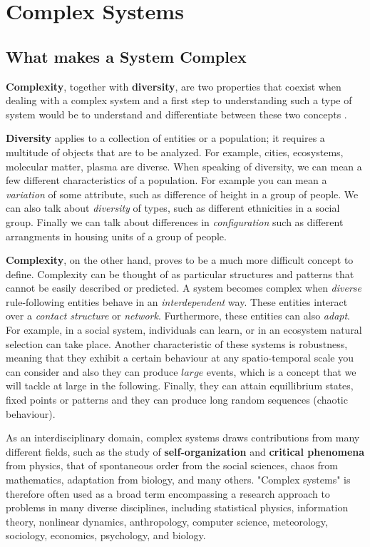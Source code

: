 \chapter{Complex Systems}
\label{chap:complexSystems}

\section{What makes a System Complex}
{\bf Complexity}, together with {\bf diversity}, are two properties that coexist when dealing with a complex system and a first step to understanding such a type of system would be to understand and differentiate between these two concepts \cite{diverscomplex}.\par

{\bf Diversity} applies to a collection of entities or a population; it requires a multitude of objects that are to be analyzed. For example, cities, ecosystems, molecular matter, plasma are diverse. When speaking of diversity, we can mean a few different characteristics of a population. For example you can mean a {\it variation} of some attribute, such as difference of height in a group of people. We can also talk about {\it diversity} of types, such as different ethnicities in a social group. Finally we can talk about differences in {\it configuration} such as different arrangments in housing units of a group of people.\par

{\bf Complexity}, on the other hand, proves to be a much more difficult concept to define. Complexity can be thought of as particular structures and patterns that cannot be easily described or predicted. A system becomes complex when {\it diverse} rule-following entities behave in an {\it interdependent} way. These entities interact over a {\it contact structure} or {\it network}. Furthermore, these entities can also {\it adapt}. For example, in a social system, individuals can learn, or in an ecosystem natural selection can take place. Another characteristic of these systems is robustness, meaning that they exhibit a certain behaviour at any spatio-temporal scale you can consider and also they can produce $large$ events, which is a concept that we will tackle at large in the following. Finally, they can attain equillibrium states, fixed points or patterns and they can produce long random sequences (chaotic behaviour).\par

As an interdisciplinary domain, complex systems draws contributions from many different fields, such as the study of {\bf self-organization} and {\bf critical phenomena} from physics, that of spontaneous order from the social sciences, chaos from mathematics, adaptation from biology, and many others. "Complex systems" is therefore often used as a broad term encompassing a research approach to problems in many diverse disciplines, including statistical physics, information theory, nonlinear dynamics, anthropology, computer science, meteorology, sociology, economics, psychology, and biology.\par 

